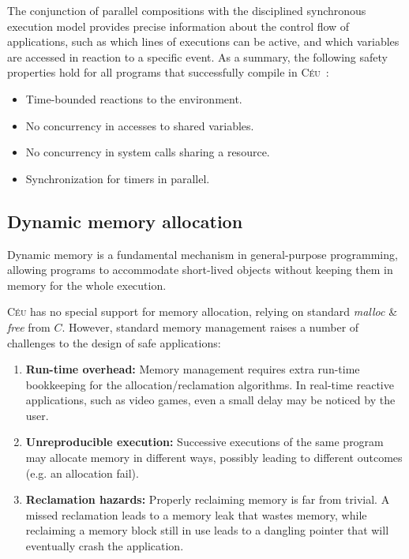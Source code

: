 \documentclass[pdftex,12pt,a4paper]{article}
\newcommand{\CEU}{\textsc{C\'{e}u}\xspace}
\begin{document}
The conjunction of parallel compositions with the disciplined synchronous 
execution model provides precise information about the control flow of 
applications, such as which lines of executions can be active, and which 
variables are accessed in reaction to a specific event.
%
As a summary, the following safety properties hold for all programs that 
successfully compile in \CEU~\cite{ceu.sensys13}:
%
\begin{itemize}
\item Time-bounded reactions to the environment.
\item No concurrency in accesses to shared variables.
\item No concurrency in system calls sharing a resource.
\item Synchronization for timers in parallel.
\end{itemize}

\subsection{Dynamic memory allocation}

Dynamic memory is a fundamental mechanism in general-purpose programming, 
allowing programs to accommodate short-lived objects without keeping them in 
memory for the whole execution.

\CEU has no special support for memory allocation, relying on standard 
\emph{malloc} \& \emph{free} from $C$.
%
However, standard memory management raises a number of challenges to the design 
of safe applications:

\begin{enumerate}
\item \textbf{Run-time overhead:}
    Memory management requires extra run-time bookkeeping for the 
    allocation/reclamation algorithms.
    In real-time reactive applications, such as video games, even a small delay 
    may be noticed by the user.
\item \textbf{Unreproducible execution:}
    Successive executions of the same program may allocate memory in different 
    ways, possibly leading to different outcomes (e.g. an allocation fail).
\item \textbf{Reclamation hazards:}
    Properly reclaiming memory is far from trivial.
    A missed reclamation leads to a memory leak that wastes memory, while 
    reclaiming a memory block still in use leads to a dangling pointer that 
will eventually crash the application.
\end{enumerate}
\end{document}
